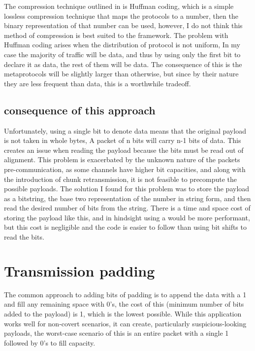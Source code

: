 The compression technique outlined in  is Huffman coding, which is a simple lossless compression technique that maps the protocols to a number, then the binary representation of that number can be used, however, I do not think this method of compression is best suited to the framework. The problem with Huffman coding arises when the distribution of protocol is not uniform, In my case the majority of traffic will be data, and thus by using only the first bit to declare it as data, the rest of them will be data. The consequence of this is the metaprotocols will be slightly larger than otherwise, but since by their nature they are less frequent than data, this is a worthwhile tradeoff.

\subsection{consequence of this approach}
\label{sec:mp_consequence}

Unfortunately, using a single bit to denote data means that the original payload is not taken in whole bytes, A packet of n bits will carry n-1 bits of data. This creates an issue when reading the payload because the bits must be read out of alignment. This problem is exacerbated by the unknown nature of the packets pre-communication, as some channels have higher bit capacities, and along with the introduction of chunk retransmission, it is not feasible to precompute the possible payloads. The solution I found for this problem was to store the payload as a bitstring, the base two representation of the number in string form, and then read the desired number of bits from the string. There is a time and space cost of storing the payload like this, and in hindsight using a  would be more performant, but this cost is negligible and the code is easier to follow than using bit shifts to read the bits.

\section{Transmission padding}
\label{sec:transmission_padding}

The common approach to adding bits of padding is to append the data with a 1 and fill any remaining space with 0's, the cost of this (minimum number of bits added to the payload) is 1, which is the lowest possible. While this application works well for non-covert scenarios, it can create, particularly suspicious-looking payloads, the worst-case scenario of this is an entire packet with a single 1 followed by 0's to fill capacity.

